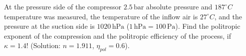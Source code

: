 \vspace{0.7cm}

At the pressure side of the compressor $2.5\,\mathrm{bar}$ absolute pressure and $187^{\circ}C$ temperature was measured,  the temperature of the inflow air is $27^{\circ}C$, and the pressure at the suction side is $1020\,\mathrm{hPa}$ ($1\,\mathrm{hPa}=100\,\mathrm{Pa}$). Find the politropic exponent of the compression and the politropic efficiency of the process, if $\kappa=1.4$! (Solution: $n=1.911$, $\eta_{pol}=0.6$).

